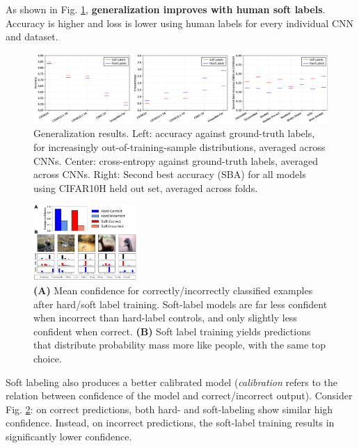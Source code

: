 As shown in Fig. \ref{fig:peterson_2}, \textbf{generalization improves with human soft labels}. Accuracy is higher and loss is lower using human labels for every individual CNN and dataset.

\begin{figure}[!ht]
    \centering
    \captionsetup{width=.8\linewidth}
    \includegraphics[width=0.9\linewidth]{images/peterson_2.png}
    \caption{Generalization results. Left: accuracy against ground-truth labels, for increasingly out-of-training-sample distributions, averaged across CNNs. Center: cross-entropy against ground-truth labels, averaged across CNNs. Right: Second best accuracy (SBA) for all models using CIFAR10H held out set, averaged across folds.}
    \label{fig:peterson_2}
\end{figure}

\begin{figure}
  \centering
  \includegraphics[width=0.35\textwidth]{images/peterson_3.png}
  \caption{\textbf{(A)} Mean confidence for correctly/incorrectly classified examples after hard/soft label training. Soft-label models are far less confident when incorrect than hard-label controls, and only slightly less confident when correct. \textbf{(B)} Soft label training yields predictions that distribute probability mass more like people, with the same top choice.}
  \label{fig:peterson_3}
\end{figure}

Soft labeling also produces a better calibrated model (\textit{calibration} refers to the relation between confidence of the model and correct/incorrect output). Consider Fig. \ref{fig:peterson_3}: on correct predictions, both hard- and soft-labeling show similar high confidence. Instead, on incorrect predictions, the soft-label training results in significantly lower confidence.\\

